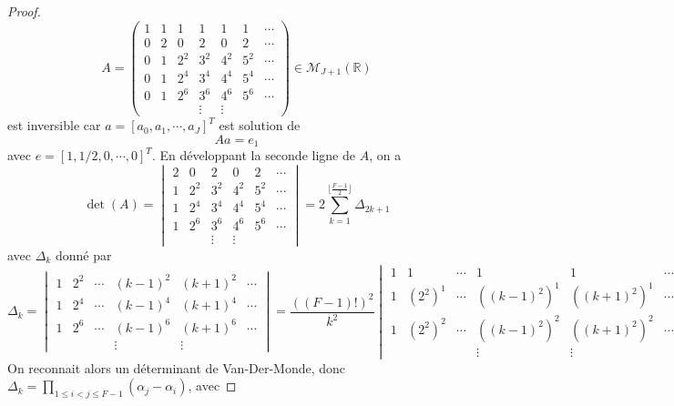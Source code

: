 \begin{proof}
\begin{equation}
A=\begin{pmatrix}
1 &  1  &  1  &  1  &  1  &  1  & \cdots\\  
0 &  2  &  0  &  2  &  0  & 2  & \cdots\\
0 &  1  & 2^2 & 3^2 & 4^2 & 5^2 & \cdots\\
0 &  1  & 2^4 & 3^4 & 4^4 & 5^4 & \cdots\\
0 &  1  & 2^6 & 3^6 & 4^6 & 5^6 & \cdots\\
&&& \vdots &  \vdots &
\end{pmatrix} \in \mathcal{M}_{J+1} \left( \mathbb{R} \right)
\end{equation}
est inversible car $a = [a_0, a_1, \cdots, a_J]^T$ est solution de 
\begin{equation}
A a = e_1
\end{equation}
avec $e = [1,1/2, 0,\cdots,0]^T$. En développant la seconde ligne de $A$, on a
\begin{equation}
\det ( A ) = \begin{vmatrix} 
2  &  0  &  2  &  0  & 2  & \cdots\\
1  & 2^2 & 3^2 & 4^2 & 5^2 & \cdots\\
1  & 2^4 & 3^4 & 4^4 & 5^4 & \cdots\\
1  & 2^6 & 3^6 & 4^6 & 5^6 & \cdots\\
& & \vdots &  \vdots &
\end{vmatrix} = 2 \sum_{k=1}^{\lfloor\frac{F-1}{2}\rfloor} \Delta_{2k+1}
\end{equation}
avec $\Delta_k$ donné par
\begin{equation}
\Delta_k = \begin{vmatrix} 
1 & 2^2 & \cdots & (k-1)^2 & (k+1)^2 & \cdots\\
1 & 2^4 & \cdots & (k-1)^4 & (k+1)^4 & \cdots\\
1 & 2^6 & \cdots & (k-1)^6 & (k+1)^6 & \cdots\\
&&& \vdots &  \vdots &
\end{vmatrix} = \dfrac{((F-1)!)^2}{k^2} \begin{vmatrix} 
1 & 1 & \cdots & 1 & 1 & \cdots\\
1 & (2^2)^1 & \cdots & ((k-1)^2)^1 & ((k+1)^2)^1 & \cdots\\
1 & (2^2)^2 & \cdots & ((k-1)^2)^2 & ((k+1)^2)^2 & \cdots\\
&&& \vdots &  \vdots &
\end{vmatrix}
\end{equation}
On reconnait alors un déterminant de Van-Der-Monde, donc $\Delta_k = \prod_{1 \leq i < j \leq F-1} \left( \alpha_j - \alpha_i \right)$, avec 

\end{proof}
